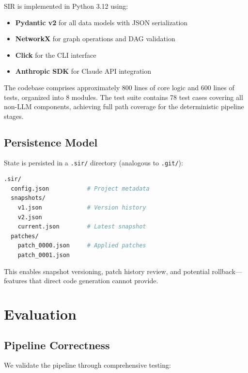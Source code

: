 \documentclass[11pt,a4paper]{article}
\begin{document}
SIR is implemented in Python 3.12 using:
\begin{itemize}
    \item \textbf{Pydantic v2} for all data models with JSON serialization
    \item \textbf{NetworkX} for graph operations and DAG validation
    \item \textbf{Click} for the CLI interface
    \item \textbf{Anthropic SDK} for Claude API integration
\end{itemize}

The codebase comprises approximately 800 lines of core logic and 600 lines of tests, organized into 8 modules. The test suite contains 78 test cases covering all non-LLM components, achieving full path coverage for the deterministic pipeline stages.

\subsection{Persistence Model}

State is persisted in a \texttt{.sir/} directory (analogous to \texttt{.git/}):

\begin{lstlisting}[language=bash]
.sir/
  config.json           # Project metadata
  snapshots/
    v1.json             # Version history
    v2.json
    current.json        # Latest snapshot
  patches/
    patch_0000.json     # Applied patches
    patch_0001.json
\end{lstlisting}

This enables snapshot versioning, patch history review, and potential rollback---features that direct code generation cannot provide.

\section{Evaluation}

\subsection{Pipeline Correctness}

We validate the pipeline through comprehensive testing:
\end{document}
